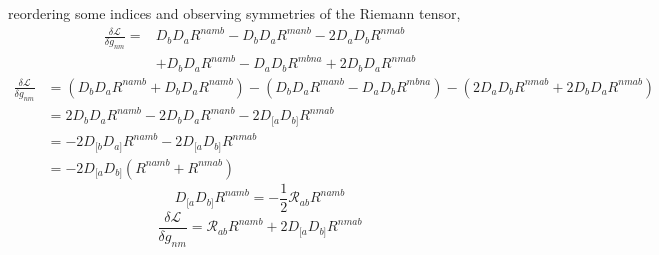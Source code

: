 \documentclass[aps,prd,preprint]{revtex4-1}
\begin{document}
\begin{fleqn}
reordering some indices and observing symmetries of the Riemann tensor,
\begin{equation*}
\begin{aligned}
    \frac{\delta \mathcal{L}}{\delta g_{nm}} = &D_b D_a R^{namb} - D_b D_a R^{manb} - 2 D_a D_b R^{nmab} \\
    &+ D_b D_a R^{namb} - D_a D_b R^{mbna} + 2 D_b D_a R^{nmab}
\end{aligned}
\end{equation*}
\begin{equation*}
\begin{aligned}
    \frac{\delta \mathcal{L}}{\delta g_{nm}} &=
    \left( D_b D_a R^{namb} + D_b D_a R^{namb} \right)
    - \left( D_b D_a R^{manb}  - D_a D_b R^{mbna}\right)
    - \left( 2 D_a D_b R^{nmab} + 2 D_b D_a R^{nmab} \right) \\
    &= 2 D_b D_a R^{namb} - 2 D_b D_a R^{manb} - 2 D_{[a} D_{b]} R^{nmab} \\
    &= -2 D_{[b} D_{a]} R^{namb} - 2 D_{[a} D_{b]} R^{nmab} \\
    &= - 2 D_{[a} D_{b]} \left( R^{namb} + R^{nmab} \right)
\end{aligned}
\end{equation*}
\begin{equation*}
    D_{[a} D_{b]} R^{namb} = -\frac{1}{2} \mathcal{R}_{ab}R^{namb}
\end{equation*}
\begin{equation*}
\boxed{
    \frac{\delta \mathcal{L}}{\delta g_{nm}} = \mathcal{R}_{ab} R^{namb} + 2 D_{[a} D_{b]} R^{nmab}
}
\end{equation*}
\end{fleqn}


\end{document}
